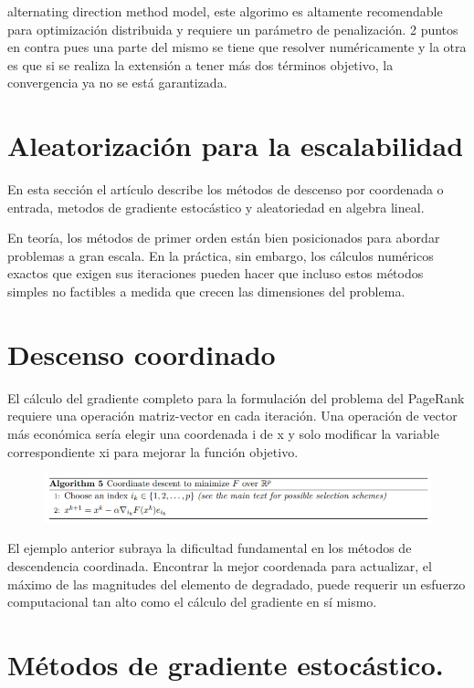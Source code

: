 \documentclass[]{article}
\begin{document}
alternating direction method model, este algorimo es altamente
recomendable para optimización distribuida y requiere un parámetro de
penalización. 2 puntos en contra pues una parte del mismo se tiene que
resolver numéricamente y la otra es que si se realiza la extensión a
tener más dos términos objetivo, la convergencia ya no se está
garantizada.

\section{Aleatorización para la
escalabilidad}\label{aleatorizacion-para-la-escalabilidad}

En esta sección el artículo describe los métodos de descenso por
coordenada o entrada, metodos de gradiente estocástico y aleatoriedad en
algebra lineal.

En teoría, los métodos de primer orden están bien posicionados para
abordar problemas a gran escala. En la práctica, sin embargo, los
cálculos numéricos exactos que exigen sus iteraciones pueden hacer que
incluso estos métodos simples no factibles a medida que crecen las
dimensiones del problema.

\section{Descenso coordinado}\label{descenso-coordinado}

El cálculo del gradiente completo para la formulación del problema del
PageRank requiere una operación matriz-vector en cada iteración. Una
operación de vector más económica sería elegir una coordenada i de x y
solo modificar la variable correspondiente xi para mejorar la función
objetivo.

\begin{figure}
\centering
\includegraphics{coord.png}
\caption{}
\end{figure}

El ejemplo anterior subraya la dificultad fundamental en los métodos de
descendencia coordinada. Encontrar la mejor coordenada para actualizar,
el máximo de las magnitudes del elemento de degradado, puede requerir un
esfuerzo computacional tan alto como el cálculo del gradiente en sí
mismo.

\section{Métodos de gradiente
estocástico.}\label{metodos-de-gradiente-estocastico.}
\end{document}
